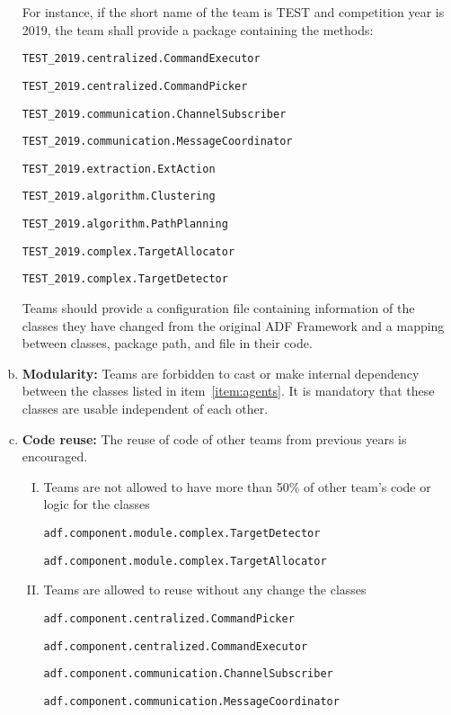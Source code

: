 \documentclass{article}
\begin{document}
\begin{enumerate}[(a)]
\normalsize
For instance, if the short name of the team is TEST and competition year is 2019, the team shall provide a package containing the methods:

\small

\texttt{TEST\_2019.centralized.CommandExecutor}

\texttt{TEST\_2019.centralized.CommandPicker}

\texttt{TEST\_2019.communication.ChannelSubscriber}

\texttt{TEST\_2019.communication.MessageCoordinator}

\texttt{TEST\_2019.extraction.ExtAction}

\texttt{TEST\_2019.algorithm.Clustering}

\texttt{TEST\_2019.algorithm.PathPlanning}

\texttt{TEST\_2019.complex.TargetAllocator}

\texttt{TEST\_2019.complex.TargetDetector}

\normalsize


Teams should provide a configuration file containing information of the classes they have changed from the original ADF Framework and a mapping between classes, package path, and file in their code. \label{item:agents}
\item \textbf{Modularity:} Teams are forbidden to cast or make internal dependency between the classes listed in item~\ref{item:agents}. It is mandatory that these classes are usable independent of each other.
\item \textbf{Code reuse:} The reuse of code of other teams from previous years is encouraged.

\begin{enumerate}[I.]
  \item Teams are not allowed to have more than 50\% of other team's code or logic for the classes

  \small
  \texttt{adf.component.module.complex.TargetDetector}

  \texttt{adf.component.module.complex.TargetAllocator}
  \item Teams are allowed to reuse without any change the classes

  \small
  \texttt{adf.component.centralized.CommandPicker}

  \texttt{adf.component.centralized.CommandExecutor}

  \texttt{adf.component.communication.ChannelSubscriber}

  \texttt{adf.component.communication.MessageCoordinator}


\end{enumerate}
\end{enumerate}
\end{document}
